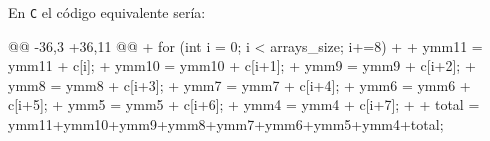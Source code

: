 \par En \texttt{C} el código equivalente sería:
\begin{listing}[firstnumber=35]
    @@ -36,3 +36,11 @@
  + for (int i = 0; i < arrays_size; i+=8)
  + {
  +    ymm11 = ymm11 + c[i];
  +    ymm10 = ymm10 + c[i+1];
  +    ymm9 = ymm9 + c[i+2];
  +    ymm8 = ymm8 + c[i+3];
  +    ymm7 = ymm7 + c[i+4];
  +    ymm6 = ymm6 + c[i+5];
  +    ymm5 = ymm5 + c[i+6];
  +    ymm4 = ymm4 + c[i+7];
  + }
  + total = ymm11+ymm10+ymm9+ymm8+ymm7+ymm6+ymm5+ymm4+total;
\end{listing}